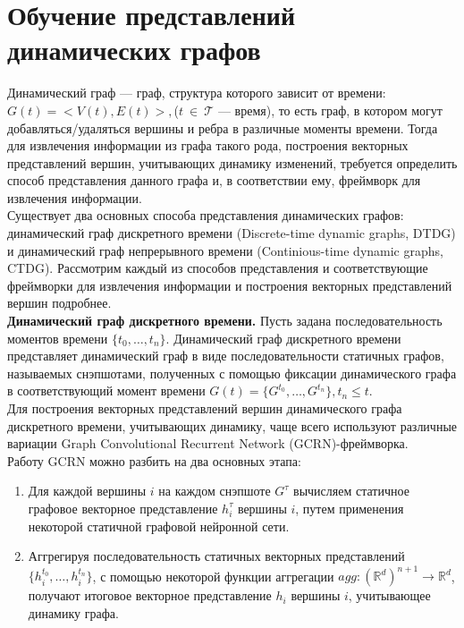 \documentclass[a4paper,14pt,oneside]{mipt-thesis-ms}
\renewcommand{\leq}{\leqslant}  %
\begin{document}
\section{Обучение представлений динамических графов}
Динамический граф --- граф, структура которого зависит от времени: $G(t) = <V(t), E(t)>,$($t~\in~\mathcal{T}$ --- время), то есть граф, в котором могут добавляться/удаляться вершины и ребра в различные моменты времени. Тогда для извлечения информации из графа такого рода, построения векторных представлений вершин, учитывающих динамику изменений, требуется определить способ представления данного графа и, в соответствии ему, фреймворк для извлечения информации.\cite{rossi01}\\

Существует два основных способа представления динамических графов: динамический граф дискретного времени (Discrete-time dynamic graphs, DTDG) и динамический граф непрерывного времени (Continious-time dynamic graphs, CTDG). Рассмотрим каждый из способов представления и соответствующие фреймворки для извлечения информации и построения векторных представлений вершин подробнее.\\

{\bf Динамический граф дискретного времени.} Пусть задана последовательность моментов времени $\{t_0, \dots, t_n\}$. Динамический граф дискретного времени представляет динамический граф в виде последовательности статичных графов, называемых снэпшотами, полученных с помощью фиксации динамического графа в соответствующий момент времени $G(t) = \{G^{t_0}, \dots, G^{t_n}\}, t_n \leq t$.\\

Для построения векторных представлений вершин динамического графа дискретного времени, учитывающих динамику, чаще всего используют различные вариации Graph Convolutional Recurrent Network (GCRN)-фреймворка\cite{seo01}.\\

Работу GCRN можно разбить на два основных этапа:
\begin{enumerate}
\item Для каждой вершины $i$ на каждом снэпшоте $G^{\tau}$ вычисляем статичное графовое векторное представление $h_i^{\tau}$ вершины $i$, путем применения некоторой статичной графовой нейронной сети.
\item Аггрегируя последовательность статичных векторных представлений $\{h_i^{t_0}, \dots, h_i^{t_n}\}$, с помощью некоторой функции аггрегации $agg: (\mathbb{R}^d)^{n+1} \rightarrow \mathbb{R}^d$, получают итоговое векторное представление $h_i$ вершины $i$, учитывающее динамику графа.
\end{enumerate}
\end{document}
